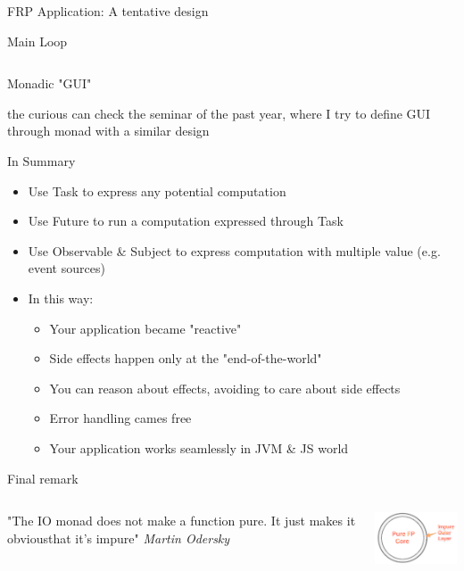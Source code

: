 \documentclass[presentation, 9pt]{beamer}\mode<presentation>{\usetheme{AMSBolognaFC}}
\begin{document}
\begin{frame}{FRP Application: A tentative design \href{https://github.com/cric96/scala-frp-gui}{\faLink}}
\begin{alertblock}{Main Loop}
\begin{tcolorbox}[left=0pt, top=0pt, bottom=0pt]
\begin{verbatim}
					\end{verbatim}
					\end{tcolorbox}
				\end{alertblock}	
				\begin{alertblock}{Monadic "GUI"}

the curious can check the seminar of the past year, where I try to define GUI through monad with a similar design \href{https://github.com/cric96/MVC-meets-monad/releases/tag/0.1.0-2021-06-04T085146}{\faLink}
				\end{alertblock}
\end{frame}
\begin{frame}[fragile]{In Summary}
	\begin{itemize}
		\item Use Task to express any potential computation
  	\item Use Future to run a computation expressed through Task 
   	\item Use Observable \& Subject to express computation with multiple value (e.g. event sources)
    \item In this way:
    \begin{itemize}
			\item Your application became "reactive" 
   		\item Side effects happen only at the "end-of-the-world"
     \item You can reason about effects, avoiding to care about side effects
     \item Error handling cames free
     \item Your application works seamlessly in JVM \& JS world
		\end{itemize}
	\end{itemize}
	\begin{alertblock}{Final remark}
		\begin{columns}
			\begin{column}[c]{0.4\textwidth}
				"The IO monad does not make a function pure. It just makes it obviousthat it's impure"
				\emph{Martin Odersky}
			\end{column}
			\begin{column}[c]{0.4\textwidth}

	\includegraphics[width=4cm]{img/pure-impure.png}
			\end{column}
		\end{columns}
	\end{alertblock}
\end{frame}
\end{document}

